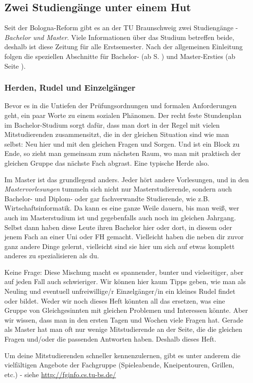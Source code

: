 \subsection{Zwei Studiengänge unter einem Hut}
	Seit der Bologna-Reform gibt es an der TU Braunschweig zwei Studiengänge - \textit{Bachelor und Master}. Viele Informationen über das Studium betreffen beide, deshalb ist diese Zeitung für alle Erstsemester. Nach der allgemeinen Einleitung folgen die speziellen Abschnitte für Bachelor- (ab S. \pageref{bachelor}) und Master-Ersties (ab Seite \pageref{master}).

\subsubsection{Herden, Rudel und Einzelgänger}
	Bevor es in die Untiefen der Prüfungsordnungen und formalen Anforderungen geht, ein paar Worte zu einem sozialen Phänomen. Der recht feste Stundenplan im Bachelor-Studium sorgt dafür, dass man dort in der Regel mit vielen Mitstudierenden zusammensitzt, die in der gleichen Situation sind wie man selbst: Neu hier und mit den gleichen Fragen und Sorgen. Und ist ein Block zu Ende, so zieht man gemeinsam zum nächsten Raum, wo man mit praktisch der gleichen Gruppe das nächste Fach abgrast. Eine typische Herde also.

	Im Master ist das grundlegend anders. Jeder hört andere Vorlesungen, und in den \emph{Mastervorlesungen} tummeln sich nicht nur Masterstudierende, sondern auch Bachelor- und Diplom- oder gar fachverwandte Studierende, wie z.B. Wirtschaftsinformatik. Da kann es eine ganze Weile dauern, bis man weiß, wer auch im Masterstudium ist und gegebenfalls auch noch im gleichen Jahrgang. Selbst dann haben diese Leute ihren Bachelor hier oder dort, in diesem oder jenem Fach an einer Uni oder FH gemacht. Vielleicht haben die neben dir zuvor ganz andere Dinge gelernt, vielleicht sind sie hier um sich auf etwas komplett anderes zu spezialisieren als du.

	Keine Frage: Diese Mischung macht es spannender, bunter und vielseitiger, aber auf jeden Fall auch schwieriger. Wir können hier kaum Tipps geben, wie man als Neuling und eventuell unfreiwillige/r Einzelgänger/in ein kleines Rudel findet oder bildet. Weder wir noch dieses Heft könnten all das ersetzen, was eine Gruppe von Gleichgesinnten mit gleichen Problemen und Interessen könnte. Aber wir wissen, dass man in den ersten Tagen und Wochen viele Fragen hat. Gerade als Master hat man oft nur wenige Mitstudierende an der Seite, die die gleichen Fragen und/oder die passenden Antworten haben. Deshalb dieses Heft.

	Um deine Mitstudierenden schneller kennenzulernen, gibt es unter anderem die vielfältigen Angebote der Fachgruppe (Spieleabende, Kneipentouren, Grillen, etc.) - siehe \url{http://fginfo.cs.tu-bs.de/}
